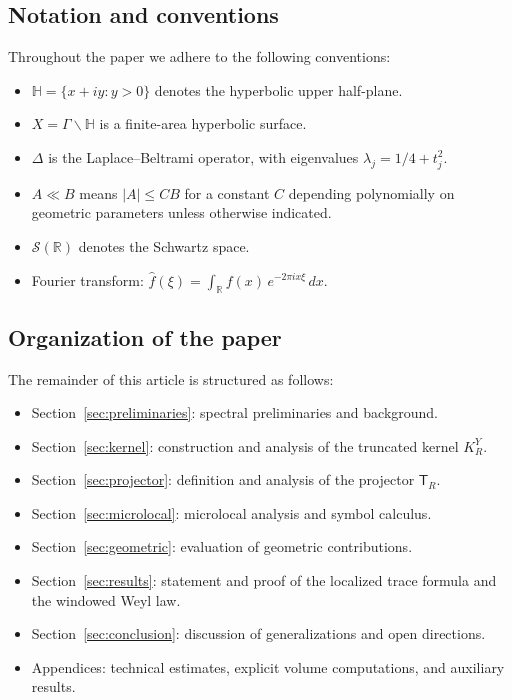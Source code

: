 \subsection{Notation and conventions}\label{subsec:notation}

Throughout the paper we adhere to the following conventions:

\begin{itemize}
  \item $\mathbb{H} = \{x+iy : y>0\}$ denotes the hyperbolic upper half-plane.
  \item $X=\Gamma\backslash \mathbb{H}$ is a finite-area hyperbolic surface.
  \item $\Delta$ is the Laplace–Beltrami operator, with eigenvalues 
        $\lambda_j = 1/4 + t_j^2$.
  \item $A \ll B$ means $|A|\leq C B$ for a constant $C$ depending polynomially on 
        geometric parameters unless otherwise indicated.
  \item $\mathcal{S}(\mathbb{R})$ denotes the Schwartz space.
  \item Fourier transform: $\widehat{f}(\xi) = \int_\mathbb{R} f(x)\,e^{-2\pi i x \xi}\,dx$.
\end{itemize}

\subsection{Organization of the paper}\label{subsec:outline}

The remainder of this article is structured as follows:

\begin{itemize}
  \item Section~\ref{sec:preliminaries}: spectral preliminaries and background.
  \item Section~\ref{sec:kernel}: construction and analysis of the truncated kernel $K_R^Y$.
  \item Section~\ref{sec:projector}: definition and analysis of the projector $\mathsf{T}_R$.
  \item Section~\ref{sec:microlocal}: microlocal analysis and symbol calculus.
  \item Section~\ref{sec:geometric}: evaluation of geometric contributions.
  \item Section~\ref{sec:results}: statement and proof of the localized trace formula and 
        the windowed Weyl law.
  \item Section~\ref{sec:conclusion}: discussion of generalizations and open directions.
  \item Appendices: technical estimates, explicit volume computations, and auxiliary 
        results.
\end{itemize}
